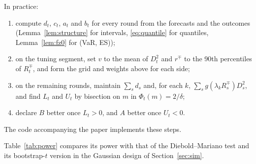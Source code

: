 \documentclass[11pt]{article}
\theoremstyle{remark}
\theoremstyle{definition}
\begin{document}
In practice:
\begin{enumerate}
\item compute $d_t$, $c_t$, $a_t$ and $b_t$ for every round from the
 forecasts and the outcomes (Lemma~\ref{lem:structure} for intervals,
 \eqref{eq:quantile} for quantiles, Lemma~\ref{lem:fz0} for (VaR, ES));
\item on the tuning segment, set $v$ to the mean of $D_t^2$ and $r^\mp$
 to the 90th percentiles of $R_t^\mp$, and form the grid and weights above
 for each side;
\item on the remaining rounds, maintain $\sum_s d_s$ and, for each $k$,
 $\sum_s g(\lambda_kR^\mp_s)D_s^2$, and find $L_t$ and $U_t$ by bisection
 on $m$ in $\Phi_t(m)=2/\delta$;
\item declare $B$ better once $L_t>0$, and $A$ better once $U_t<0$.
\end{enumerate}
The code accompanying the paper implements these steps.

Table~\ref{tab:power} compares its power with that of the Diebold--Mariano
test and its bootstrap-$t$ version in the Gaussian design of
Section~\ref{sec:sim}.

\begin{table}[h]
\centering\small
\caption{Power (\%) to declare the worse forecaster $A$ worse in the
Gaussian design of Figure~\ref{fig:detection}, at horizons $T_{80}$,
$2T_{80}$ and (for EB) $4T_{80}$, where $T_{80}$ gives the known-variance test 80\% power. DM:
two-sided 5\% Diebold--Mariano test; boot: its bootstrap-$t$ version;
EB: the tuned sequence, tuned on the first 10\% of the horizon. Neither
DM nor boot declared $A$ better in any replication. 200 replications.}
\label{tab:power}

\end{table}



\end{document}
